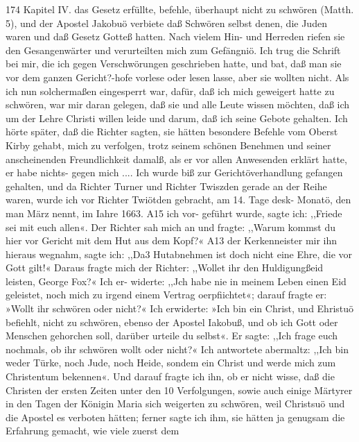 174 Kapitel IV.
das Gesetz erfüllte, befehle, überhaupt nicht zu schwören (Matth. 5),
und der Apostel Jakobuö verbiete daß Schwören selbst denen, die
Juden waren und daß Gesetz Gotteß hatten. Nach vielem Hin-
und Herreden riefen sie den Gesangenwärter und verurteilten mich
zum Gefängniö. Ich trug die Schrift bei mir, die ich gegen
Verschwörungen geschrieben hatte, und bat, daß man sie vor dem
ganzen Gericht?-hofe vorlese oder lesen lasse, aber sie wollten nicht.
Als ich nun solchermaßen eingesperrt war, dafür, daß ich mich
geweigert hatte zu schwören, war mir daran gelegen, daß sie und
alle Leute wissen möchten, daß ich um der Lehre Christi willen
leide und darum, daß ich seine Gebote gehalten. Ich hörte später,
daß die Richter sagten, sie hätten besondere Befehle vom Oberst
Kirby gehabt, mich zu verfolgen, trotz seinem schönen Benehmen
und seiner anscheinenden Freundlichkeit damalß, als er vor allen
Anwesenden erklärt hatte, er habe nichts- gegen mich ....
Ich wurde biß zur Gerichtöverhandlung gefangen gehalten, und
da Richter Turner und Richter Twiszden gerade an der Reihe waren,
wurde ich vor Richter Twiötden gebracht, am 14. Tage desk-
Monatö, den man März nennt, im Iahre 1663. A15 ich vor-
geführt wurde, sagte ich: ,,Friede sei mit euch allen«. Der
Richter sah mich an und fragte: ,,Warum kommst du hier vor
Gericht mit dem Hut aus dem Kopf?« A13 der Kerkenneister mir
ihn hieraus wegnahm, sagte ich: ,,Da3 Hutabnehmen ist doch nicht
eine Ehre, die vor Gott gilt!« Daraus fragte mich der Richter:
,,Wollet ihr den Huldigungßeid leisten, George Fox?« Ich er-
widerte: ,,Jch habe nie in meinem Leben einen Eid geleistet, noch
mich zu irgend einem Vertrag oerpfiichtet«; darauf fragte er:
»Wollt ihr schwören oder nicht?« Ich erwiderte: »Ich bin ein
Christ, und Ehristuö befiehlt, nicht zu schwören, ebenso der Apostel
Iakobuß, und ob ich Gott oder Menschen gehorchen soll, darüber
urteile du selbst«. Er sagte: ,,Ich frage euch nochmals, ob ihr
schwören wollt oder nicht?« Ich antwortete abermaltz: ,,Ich bin
weder Türke, noch Jude, noch Heide, sondem ein Christ und
werde mich zum Christentum bekennen«. Und darauf fragte ich
ihn, ob er nicht wisse, daß die Christen der ersten Zeiten unter
den 10 Verfolgungen, sowie auch einige Märtyrer in den Tagen
der Königin Maria sich weigerten zu schwören, weil Christsuö
und die Apostel es verboten hätten; ferner sagte ich ihm, sie
hätten ja genugsam die Erfahrung gemacht, wie viele zuerst dem


